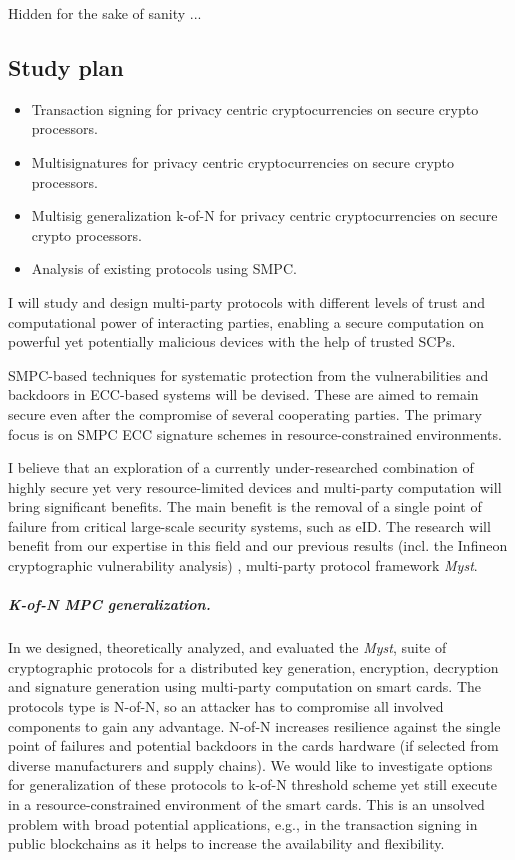 \documentclass[
  digital, %
  twoside, %
  table,   %
  lof,     %
  lot,     %
]{fithesis3}
\begin{document}
Hidden for the sake of sanity ...
\begin{ecmmnt}  %
\chapter{Study plan}
\begin{itemize}
	\item Transaction signing for privacy centric cryptocurrencies on secure crypto processors.  
    \item Multisignatures for privacy centric cryptocurrencies on secure crypto processors. 
    \item Multisig generalization k-of-N for privacy centric cryptocurrencies on secure crypto processors. 
    \item Analysis of existing protocols using SMPC. 
\end{itemize}

I will study and design multi-party protocols with different levels of trust and computational power of interacting parties, enabling a secure computation on powerful yet potentially malicious devices with the help of trusted SCPs.

SMPC-based techniques for systematic protection from the vulnerabilities and backdoors in ECC-based systems will be devised. These are aimed to remain secure even after the compromise of several cooperating parties. The primary focus is on SMPC ECC signature schemes in resource-constrained environments.

I believe that an exploration of a currently under-researched combination of highly secure yet very resource-limited devices and multi-party computation will bring significant benefits. The main benefit is the removal of a single point of failure from critical large-scale security systems, such as eID. The research will benefit from our expertise in this field and our previous results (incl. the Infineon cryptographic vulnerability analysis) \cite{2017-ccs-mavroudis, 2017-ccs-nemec}, multi-party protocol framework \emph{Myst}.

\paragraph{K-of-N MPC generalization.} In \cite{2017-ccs-mavroudis} we designed, theoretically analyzed, and evaluated the \emph{Myst}, suite of cryptographic protocols for a distributed key generation, encryption, decryption and signature generation using multi-party computation on smart cards. The protocols type is N-of-N, so an attacker has to compromise all involved components to gain any advantage. N-of-N increases resilience against the single point of failures and potential backdoors in the cards hardware (if selected from diverse manufacturers and supply chains). We would like to investigate options for generalization of these protocols to k-of-N threshold scheme yet still execute in a resource-constrained environment of the smart cards. This is an unsolved problem with broad potential applications, e.g., in the transaction signing in public blockchains as it helps to increase the availability and flexibility.  



\end{ecmmnt}
\end{document}
